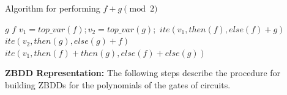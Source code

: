 \documentclass{article}
\begin{document}
\begin{algorithm}
\caption{Algorithm for performing $f+g\pmod 2$}
\label{mod2sum}
\begin{algorithmic}[1]
{\small
{}
\State \Return $g$
\State \Return $f$
\State {}
\Else
\State $v_1 = top\_var(f); v_2 = top\_var(g);$
\State \Return $ite(v_1,then(f),else(f)+g)$
\State \Return $ite(v_2,then(g),else(g)+f)$
\Else
\State \Return $ite(v_1,then(f) + then(g),else(f)+else(g))$
\EndIf


\EndIf
\EndProcedure
}
\end{algorithmic}
\end{algorithm}


{\bf ZBDD Representation:} %
The following steps describe the procedure for building ZBDDs for the polynomials of the gates of circuits.
\end{document}
